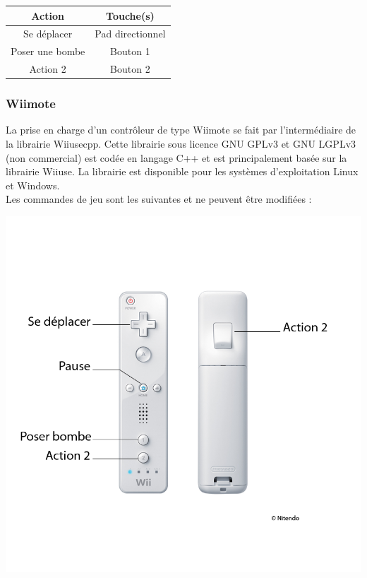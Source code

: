 \begin{center}
	\begin{tabular}{|c|c|}
		\hline
			\rowcolor{blueTab}
			\textbf{Action} & \textbf{Touche(s)} \\
		\hline
		Se déplacer & Pad directionnel \\
		\hline
		Poser une bombe & Bouton 1\\
		\hline
		Action 2 & Bouton 2\\
		\hline
	\end{tabular}
\end{center}


\subsubsection{Wiimote}
La prise en charge d'un contrôleur de type Wiimote se fait par l'intermédiaire de la librairie Wiiusecpp. Cette librairie sous licence GNU GPLv3 et GNU LGPLv3 (non commercial) est codée en langage C++ et est principalement basée sur la librairie Wiiuse. La librairie est disponible pour les systèmes d'exploitation Linux et Windows.\\

Les commandes de jeu sont les suivantes et ne peuvent être modifiées :\\

\begin{center}
	\includegraphics[scale=1.7]{images/wiimote}
\end{center}
